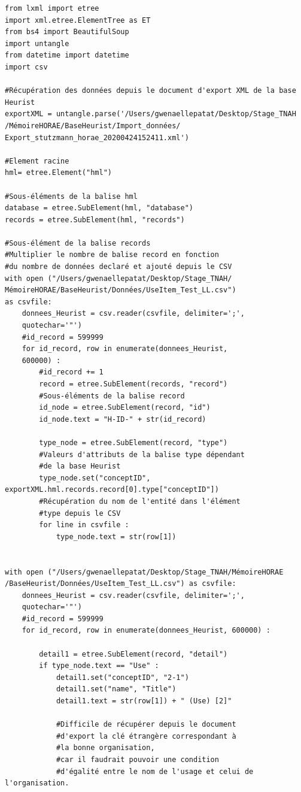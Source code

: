 \documentclass[a4paper,12pt,twoside]{book}
\begin{document}
\begin{verbatim}
from lxml import etree
import xml.etree.ElementTree as ET
from bs4 import BeautifulSoup
import untangle
from datetime import datetime
import csv

#Récupération des données depuis le document d'export XML de la base Heurist
exportXML = untangle.parse('/Users/gwenaellepatat/Desktop/Stage_TNAH
/MémoireHORAE/BaseHeurist/Import_données/
Export_stutzmann_horae_20200424152411.xml')

#Element racine
hml= etree.Element("hml")

#Sous-éléments de la balise hml
database = etree.SubElement(hml, "database")
records = etree.SubElement(hml, "records")

#Sous-élément de la balise records
#Multiplier le nombre de balise record en fonction 
#du nombre de données declaré et ajouté depuis le CSV
with open ("/Users/gwenaellepatat/Desktop/Stage_TNAH/
MémoireHORAE/BaseHeurist/Données/UseItem_Test_LL.csv") 
as csvfile:
    donnees_Heurist = csv.reader(csvfile, delimiter=';',
    quotechar='"')
    #id_record = 599999
    for id_record, row in enumerate(donnees_Heurist, 
    600000) :
        #id_record += 1
        record = etree.SubElement(records, "record")
        #Sous-éléments de la balise record
        id_node = etree.SubElement(record, "id")
        id_node.text = "H-ID-" + str(id_record)

        type_node = etree.SubElement(record, "type")
        #Valeurs d'attributs de la balise type dépendant 
        #de la base Heurist
        type_node.set("conceptID", exportXML.hml.records.record[0].type["conceptID"])
        #Récupération du nom de l'entité dans l'élément 
        #type depuis le CSV
        for line in csvfile :
            type_node.text = str(row[1])


with open ("/Users/gwenaellepatat/Desktop/Stage_TNAH/MémoireHORAE
/BaseHeurist/Données/UseItem_Test_LL.csv") as csvfile:
    donnees_Heurist = csv.reader(csvfile, delimiter=';', 
    quotechar='"')
    #id_record = 599999
    for id_record, row in enumerate(donnees_Heurist, 600000) :

        detail1 = etree.SubElement(record, "detail")
        if type_node.text == "Use" :
            detail1.set("conceptID", "2-1")
            detail1.set("name", "Title")
            detail1.text = str(row[1]) + " (Use) [2]"

            #Difficile de récupérer depuis le document
            #d'export la clé étrangère correspondant à 
            #la bonne organisation,
            #car il faudrait pouvoir une condition 
            #d'égalité entre le nom de l'usage et celui de l'organisation.


\end{verbatim}
\end{document}
